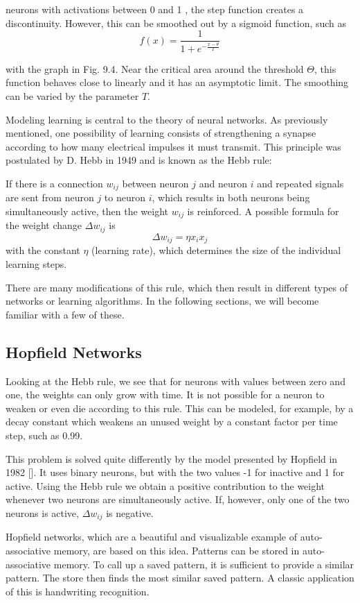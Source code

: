 \documentclass[10pt]{book}
\begin{document}
neurons with activations between 0 and 1 , the step function creates a discontinuity. However, this can be smoothed out by a sigmoid function, such as
$$
f(x)=\frac{1}{1+e^{-\frac{x-\theta}{T}}}
$$

with the graph in Fig. 9.4. Near the critical area around the threshold $\Theta$, this function behaves close to linearly and it has an asymptotic limit. The smoothing can be varied by the parameter $T$.

Modeling learning is central to the theory of neural networks. As previously mentioned, one possibility of learning consists of strengthening a synapse according to how many electrical impulses it must transmit. This principle was postulated by D. Hebb in 1949 and is known as the Hebb rule:

If there is a connection $w_{i j}$ between neuron $j$ and neuron $i$ and repeated signals are sent from neuron $j$ to neuron $i$, which results in both neurons being simultaneously active, then the weight $w_{i j}$ is reinforced. A possible formula for the weight change $\Delta w_{i j}$ is
$$
\Delta w_{i j}=\eta x_{i} x_{j}
$$
with the constant $\eta$ (learning rate), which determines the size of the individual learning steps.

There are many modifications of this rule, which then result in different types of networks or learning algorithms. In the following sections, we will become familiar with a few of these.

\subsection{Hopfield Networks}
Looking at the Hebb rule, we see that for neurons with values between zero and one, the weights can only grow with time. It is not possible for a neuron to weaken or even die according to this rule. This can be modeled, for example, by a decay constant which weakens an unused weight by a constant factor per time step, such as 0.99.

This problem is solved quite differently by the model presented by Hopfield in 1982 [\cite{hopfield1982emergent}]. It uses binary neurons, but with the two values -1 for inactive and 1 for active. Using the Hebb rule we obtain a positive contribution to the weight whenever two neurons are simultaneously active. If, however, only one of the two neurons is active, $\Delta w_{i j}$ is negative.

Hopfield networks, which are a beautiful and visualizable example of auto-associative memory, are based on this idea. Patterns can be stored in auto-associative memory. To call up a saved pattern, it is sufficient to provide a similar pattern. The store then finds the most similar saved pattern. A classic application of this is handwriting recognition.
\end{document}
